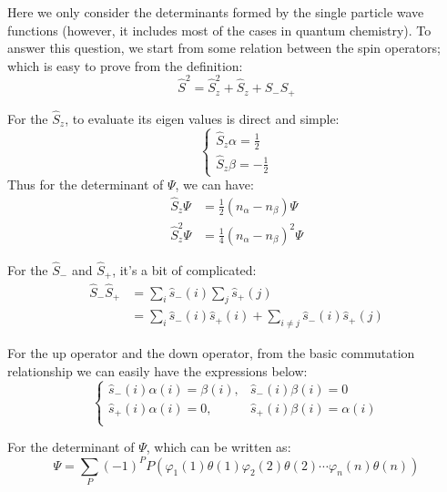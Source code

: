 Here we only consider the determinants formed by the single particle
wave functions (however, it includes most of the cases in quantum
chemistry). To answer this question, we start from some relation
between the spin operators; which is easy to prove from the
definition:
\begin{equation}\label{}
\hat{S}^{2} = \hat{S}_{z}^{2} + \hat{S}_{z} + \hat{S}_{-}\hat{S}_{+}
\end{equation}

For the $\hat{S}_{z}$, to evaluate its eigen values is direct and
simple:
\begin{equation}\label{}
\left\{
  \begin{array}{ll}
    \hat{S}_{z}\alpha = \frac{1}{2} \\
    \hat{S}_{z}\beta  =-\frac{1}{2}
  \end{array}
\right.
\end{equation}
Thus for the determinant of $\Psi$, we can have:
\begin{align}\label{}
\hat{S}_{z}\Psi     &= \frac{1}{2}(n_{\alpha} - n_{\beta})\Psi
\nonumber
\\
\hat{S}_{z}^{2}\Psi &= \frac{1}{4}(n_{\alpha} - n_{\beta})^{2}\Psi
\end{align}

For the $\hat{S}_{-}$ and $\hat{S}_{+}$, it's a bit of complicated:
\begin{align}\label{}
\hat{S}_{-}\hat{S}_{+} &=
\sum_{i}\hat{s}_{-}(i)\sum_{j}\hat{s}_{+}(j)  \nonumber \\
&=\sum_{i}\hat{s}_{-}(i)\hat{s}_{+}(i) + \sum_{i \neq
j}\hat{s}_{-}(i)\hat{s}_{+}(j)
\end{align}

For the up operator and the down operator, from the basic
commutation relationship we can easily have the expressions below:
\begin{equation}\label{}
\left\{
  \begin{array}{ll}
    \hat{s}_{-}(i)\alpha(i) = \beta(i), &  \hat{s}_{-}(i)\beta(i) = 0 \\
    \hat{s}_{+}(i)\alpha(i) = 0       , &  \hat{s}_{+}(i)\beta(i) = \alpha(i) \\
  \end{array}
\right.
\end{equation}

For the determinant of $\Psi$, which can be written as:
\begin{equation}\label{}
\Psi =
\sum_{P}(-1)^{P}P(\varphi_{1}(1)\theta(1)\varphi_{2}(2)\theta(2)
\cdots\varphi_{n}(n)\theta(n))
\end{equation}

